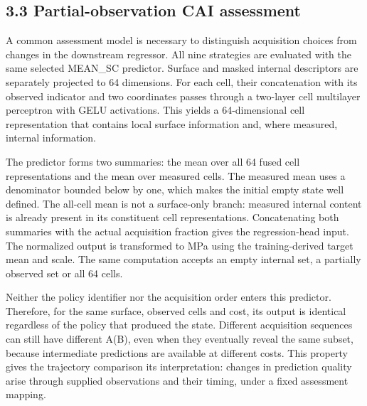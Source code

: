 \hypertarget{partial-observation-cai-assessment}{%
\subsection{3.3 Partial-observation CAI assessment}\label{partial-observation-cai-assessment}}

A common assessment model is necessary to distinguish acquisition choices from changes in the downstream regressor. All nine strategies are evaluated with the same selected MEAN\_SC predictor. Surface and masked internal descriptors are separately projected to 64 dimensions. For each cell, their concatenation with its observed indicator and two coordinates passes through a two-layer cell multilayer perceptron with GELU activations. This yields a 64-dimensional cell representation that contains local surface information and, where measured, internal information.

The predictor forms two summaries: the mean over all 64 fused cell representations and the mean over measured cells. The measured mean uses a denominator bounded below by one, which makes the initial empty state well defined. The all-cell mean is not a surface-only branch: measured internal content is already present in its constituent cell representations. Concatenating both summaries with the actual acquisition fraction gives the regression-head input. The normalized output is transformed to MPa using the training-derived target mean and scale. The same computation accepts an empty internal set, a partially observed set or all 64 cells.

Neither the policy identifier nor the acquisition order enters this predictor. Therefore, for the same surface, observed cells and cost, its output is identical regardless of the policy that produced the state. Different acquisition sequences can still have different A(B), even when they eventually reveal the same subset, because intermediate predictions are available at different costs. This property gives the trajectory comparison its interpretation: changes in prediction quality arise through supplied observations and their timing, under a fixed assessment mapping.

